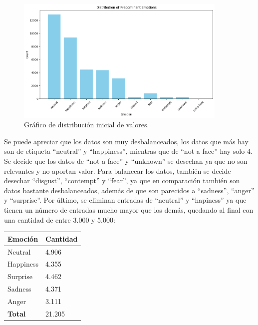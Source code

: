 \documentclass[12pt]{report} %
\begin{document}
\begin{figure}[H]
	\centering
	\includegraphics[width=0.9\textwidth]{distribucionInicial.png}
	\caption{Gráfico de distribución inicial de valores.}
	\label{fig:imagen30}
\end{figure}

Se puede apreciar que los datos son muy desbalanceados, los datos que más hay son de etiqueta “neutral” y “happiness”, mientras que de “not a face” hay solo 4. Se decide que los datos de “not a face” y “unknown” se desechan ya que no son relevantes y no aportan valor. Para balancear los datos, también se decide desechar “disgust”, “contempt” y “fear”, ya que en comparación también son datos bastante desbalanceados, además de que son parecidos a “sadness”, “anger” y “surprise”. Por último, se eliminan entradas de “neutral” y “hapiness” ya que tienen un número de entradas mucho mayor que los demás, quedando al final con una cantidad de entre 3.000 y 5.000:

\begin{table}[H]
	{
	  \begin{tabular}{|P{9cm}|P{4cm}|}
		\hline
		{\textbf{Emoción}} & {\textbf{Cantidad}} \\
		\hline
		Neutral & 4.906 \\
		\hline
		Happiness & 4.355 \\
		\hline
		Surprise & 4.462 \\
		\hline
		Sadness & 4.371 \\
		\hline
		Anger & 3.111 \\
		\hline
		{\textbf{Total}} & 21.205 \\
		\hline
	  \end{tabular}
	}
\end{table}
\end{document}
